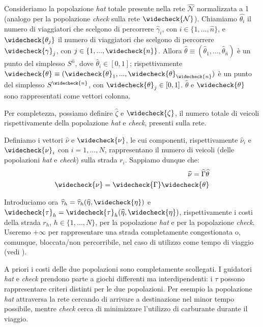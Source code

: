 Consideriamo la popolazione \textit{hat} totale presente nella rete $\widehat{\mathcal{N}}$ normalizzata a 1 (analogo per la popolazione \textit{check} sulla rete $\widecheck{\mathcal{N}}$).
Chiamiamo $\widehat{\theta_i}$ il numero di viaggiatori che scelgono di percorrere $\widehat{\gamma}_i$, con $i\in\{1,...,\widehat{n}\}$, e $\widecheck{\theta_j}$ il numero di
viaggiatori che scelgono di percorrere $\widecheck{\gamma}_j$, con $j\in\{1,...,\widecheck{n}\}$. Allora $\widehat{\theta}\equiv(\widehat{\theta}_1,...,\widehat{\theta}_{\widehat{n}})$
è un punto del simplesso $S^{\widehat{n}}$, dove $\widehat{\theta}_i\in[0,1]$; rispettivamente $\widecheck{\theta}\equiv(\widecheck{\theta}_1,...,\widecheck{\theta}_{\widecheck{n}})$
è un punto del simplesso $S^{\widecheck{n}}$, con $\widecheck{\theta}_j\in[0,1]$. $\widehat{\theta}$ e $\widecheck{\theta}$ sono rappresentati
come vettori colonna.

Per completezza, possiamo definire $\widehat{\zeta}$ e $\widecheck{\zeta}$, il numero totale di veicoli rispettivamente della popolazione \textit{hat} e \textit{check},
presenti sulla rete.

Definiamo i vettori $\widehat{\nu}$ e $\widecheck{\nu}$, le cui componenti, rispettivamente $\widehat{\nu}_i$ e $\widecheck{\nu}_i$ con $i=1,...,N$,
rappresentano il numero di veicoli (delle popolazioni \textit{hat} e \textit{check}) sulla strada $r_i$.
Sappiamo dunque che:
\begin{equation}
    \begin{split}
    \widehat{\nu}=\widehat{\Gamma}\widehat{\theta}\\
    \widecheck{\nu}=\widecheck{\Gamma}\widecheck{\theta}
    \end{split}
    \label{eq:1}
\end{equation}

Introduciamo ora $\widehat{\tau}_h=\widehat{\tau}_h(\widehat{\eta},\widecheck{\eta})$ e $\widecheck{\tau}_h=\widecheck{\tau}_h(\widehat{\eta},\widecheck{\eta})$,
rispettivamente i costi della strada $r_h$, $h\in\{1,...,N\}$, per la popolazione \textit{hat} e per la popolazione \textit{check}. Useremo $+\infty$ per rappresentare una strada
completamente congestionata o, comunque, bloccata/non percorribile, nel caso di utilizzo come tempo di viaggio (vedi \cite[cap. 2]{MR4911797}).

A priori i costi delle due popolazioni sono completamente scollegati. I guidatori \textit{hat} e \textit{check} prendono parte a giochi differenti ma interdipendenti: i $\tau$
possono rappresentare criteri distinti per le due popolazioni. Per esempio la popolazione \textit{hat} attraversa la rete cercando di arrivare a destinazione nel minor tempo possibile, mentre \textit{check}
cerca di minimizzare l'utilizzo di carburante durante il viaggio.

